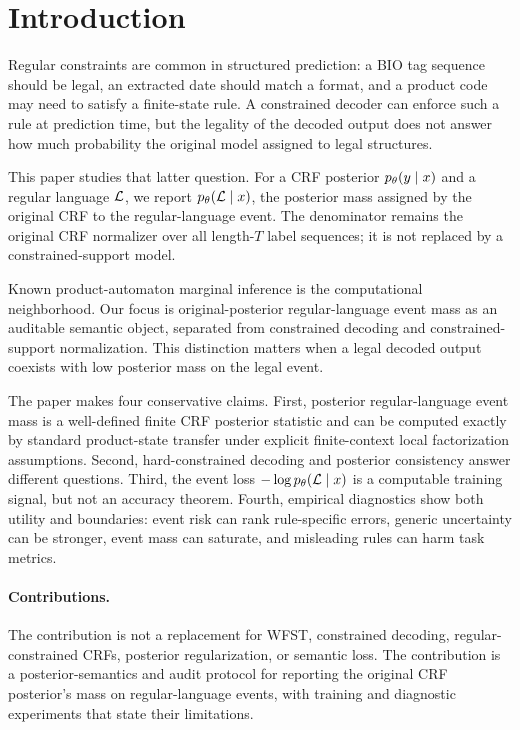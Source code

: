 \section{Introduction}

Regular constraints are common in structured prediction: a BIO tag sequence
should be legal, an extracted date should match a format, and a product code may
need to satisfy a finite-state rule.  A constrained decoder can enforce such a
rule at prediction time, but the legality of the decoded output does not answer
how much probability the original model assigned to legal structures.

This paper studies that latter question.  For a CRF posterior
\(p_{\theta}(y \mid x)\) and a regular language \(\mathcal{L}\), we report
\(p_{\theta}(\mathcal{L} \mid x)\), the posterior mass assigned by the original CRF to
the regular-language event.  The denominator remains the original CRF
normalizer over all length-\(T\) label sequences; it is not replaced by a
constrained-support model.

Known product-automaton marginal inference is the computational neighborhood.
Our focus is original-posterior regular-language event mass as an auditable
semantic object, separated from constrained decoding and constrained-support
normalization.  This distinction matters when a legal decoded output coexists
with low posterior mass on the legal event.

The paper makes four conservative claims.  First, posterior regular-language
event mass is a well-defined finite CRF posterior statistic and can be computed
exactly by standard product-state transfer under explicit finite-context local
factorization assumptions.  Second, hard-constrained decoding and posterior
consistency answer different questions.  Third, the event loss
\(-\log p_{\theta}(\mathcal{L} \mid x)\) is a computable training signal, but not an
accuracy theorem.  Fourth, empirical diagnostics show both utility and
boundaries: event risk can rank rule-specific errors, generic uncertainty can
be stronger, event mass can saturate, and misleading rules can harm task
metrics.

\paragraph{Contributions.}
The contribution is not a replacement for WFST, constrained decoding,
regular-constrained CRFs, posterior regularization, or semantic loss.  The
contribution is a posterior-semantics and audit protocol for reporting the
original CRF posterior's mass on regular-language events, with training and
diagnostic experiments that state their limitations.

